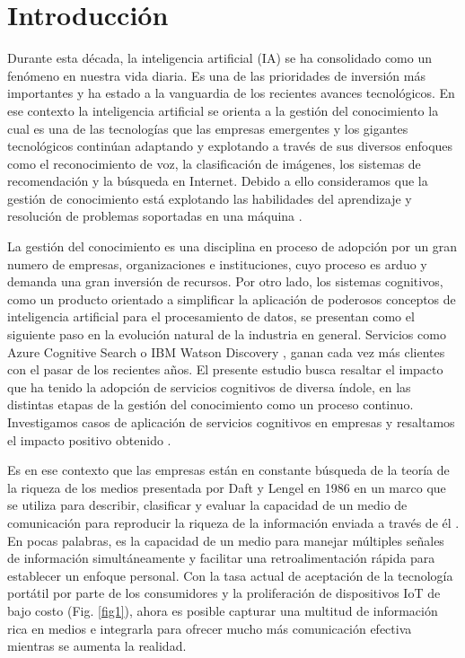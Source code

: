 \section{Introducción}

Durante esta década, la inteligencia artificial (IA) se ha consolidado como un fenómeno en nuestra vida diaria. Es una de las prioridades de inversión más importantes y ha estado a la vanguardia de los recientes avances tecnológicos. En ese contexto la inteligencia artificial se orienta a la gestión del conocimiento la cual es una de las tecnologías que las empresas emergentes y los gigantes tecnológicos continúan adaptando y explotando a través de sus diversos enfoques como el reconocimiento de voz, la clasificación de imágenes, los sistemas de recomendación y la búsqueda en Internet. Debido a ello consideramos que la gestión de conocimiento está explotando las habilidades del aprendizaje y resolución de problemas soportadas en una máquina \cite{Ogiela2018}.

La gestión del conocimiento es una disciplina en proceso de adopción por un gran numero de empresas, organizaciones e instituciones, cuyo proceso es arduo y demanda una gran inversión de recursos. Por otro lado, los sistemas cognitivos, como un producto orientado a simplificar la aplicación de poderosos conceptos de inteligencia artificial para el procesamiento de datos, se presentan como el siguiente paso en la evolución natural de la industria en general. Servicios como Azure Cognitive Search o IBM Watson Discovery \cite{Tadejko2020}, ganan cada vez más clientes con el pasar de los recientes años. El presente estudio busca resaltar el impacto que ha tenido la adopción de servicios cognitivos de diversa índole, en las distintas etapas de la gestión del conocimiento como un proceso continuo. Investigamos casos de aplicación de servicios cognitivos en empresas y resaltamos el impacto positivo obtenido \cite{Gartner1}.

Es en ese contexto que las empresas están en constante búsqueda de la teoría de la riqueza de los medios presentada por Daft y Lengel en 1986 en un marco que se utiliza para describir, clasificar y evaluar la capacidad de un medio de comunicación para reproducir la riqueza de la información enviada a través de él \cite{Sheth2019}.  En pocas palabras, es la capacidad de un medio para manejar múltiples señales de información simultáneamente y facilitar una retroalimentación rápida para establecer un enfoque personal.  Con la tasa actual de aceptación de la tecnología portátil por parte de los consumidores  y la proliferación de dispositivos IoT de bajo costo (Fig. \ref{fig1}), ahora es posible capturar una multitud de información rica en medios e integrarla para ofrecer mucho más comunicación efectiva mientras se aumenta la realidad.

